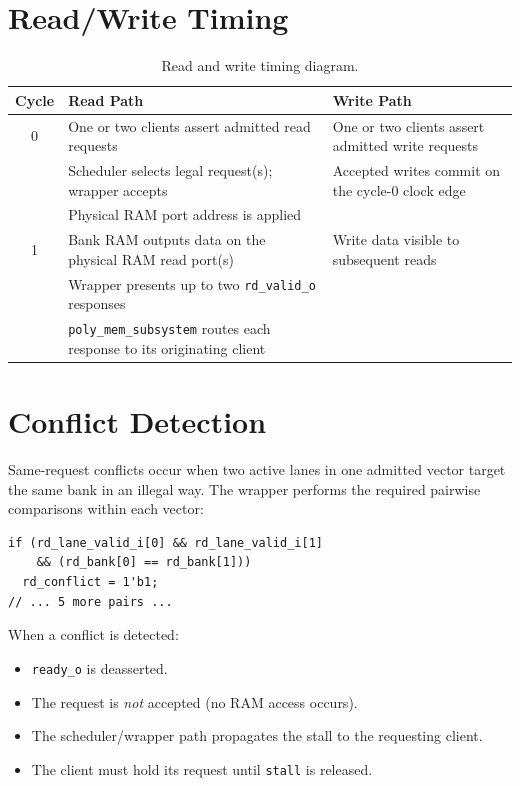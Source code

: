 \documentclass[11pt,letterpaper]{article}
\begin{document}
\section{Read/Write Timing}
\label{sec:timing}

\begin{table}[H]
\centering
\caption{Read and write timing diagram.}
\label{tab:timing}
\begin{tabular}{@{}cll@{}}
\toprule
\textbf{Cycle} & \textbf{Read Path} & \textbf{Write Path} \\
\midrule
0 & One or two clients assert admitted read requests
  & One or two clients assert admitted write requests \\
  & Scheduler selects legal request(s); wrapper accepts
  & Accepted writes commit on the cycle-0 clock edge \\
  & Physical RAM port address is applied
  & \\
\midrule
1 & Bank RAM outputs data on the physical RAM read port(s)
  & Write data visible to subsequent reads \\
  & Wrapper presents up to two \texttt{rd\_valid\_o} responses
  & \\
  & \texttt{poly\_mem\_subsystem} routes each response to its originating client
  & \\
\bottomrule
\end{tabular}
\end{table}

\section{Conflict Detection}
\label{sec:conflict}

Same-request conflicts occur when two active lanes in one admitted vector
target the same bank in an illegal way. The wrapper performs the required
pairwise comparisons within each vector:

\begin{lstlisting}[style=sv, caption={Conflict detection excerpt.}]
if (rd_lane_valid_i[0] && rd_lane_valid_i[1]
    && (rd_bank[0] == rd_bank[1]))
  rd_conflict = 1'b1;
// ... 5 more pairs ...
\end{lstlisting}

When a conflict is detected:
\begin{itemize}
  \item \texttt{ready\_o} is deasserted.
  \item The request is \emph{not} accepted (no RAM access occurs).
  \item The scheduler/wrapper path propagates the stall to the requesting client.
  \item The client must hold its request until \texttt{stall} is released.
\end{itemize}
\end{document}
